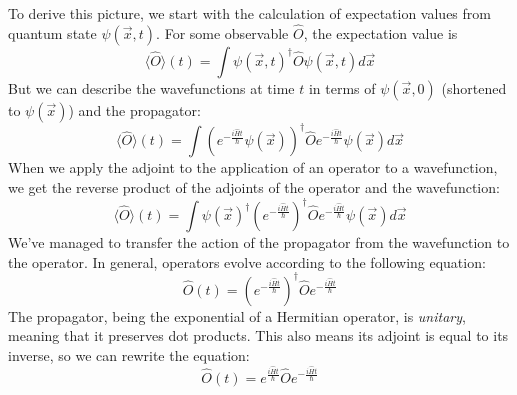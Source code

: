 To derive this picture, we start with the calculation of expectation values from quantum state
$\psi\left(\vec{x},t\right)$. For some observable $\hat{O}$, the expectation value is
\begin{equation}
\langle\hat{O}\rangle\left(t\right) = \int 
    \psi\left(\vec{x},t\right)^\dagger \hat{O} \psi\left(\vec{x},t\right) d\vec{x}
\end{equation}
But we can describe the wavefunctions at time $t$ in terms of $\psi\left(\vec{x},0\right)$ 
(shortened to $\psi\left(\vec{x}\right)$) and the propagator:
\begin{equation}
\langle\hat{O}\rangle\left(t\right) = \int
    \left(e^{-\frac{i\hat{H}t}{\hbar}}\psi\left(\vec{x}\right)\right)^\dagger 
    \hat{O} e^{-\frac{i\hat{H}t}{\hbar}} \psi\left(\vec{x}\right) d\vec{x}
\end{equation}
When we apply the adjoint to the application of an operator to a wavefunction, we get the reverse
product of the adjoints of the operator and the wavefunction:
\begin{equation}
\langle\hat{O}\rangle\left(t\right) = \int
    \psi\left(\vec{x}\right)^\dagger \left(e^{-\frac{i\hat{H}t}{\hbar}}\right)^\dagger
    \hat{O} e^{-\frac{i\hat{H}t}{\hbar}} \psi\left(\vec{x}\right) d\vec{x}
\end{equation}
We've managed to transfer the action of the propagator from the wavefunction to the operator. In
general, operators evolve according to the following equation:
\begin{equation}
\hat{O}\left(t\right) =
\left(e^{-\frac{i\hat{H}t}{\hbar}}\right)^\dagger \hat{O} e^{-\frac{i\hat{H}t}{\hbar}}
\end{equation}
The propagator, being the exponential of a Hermitian operator, is \textit{unitary}, meaning that it
preserves dot products. This also means its adjoint is equal to its inverse, so we can rewrite the
equation:
\begin{equation}
\hat{O}\left(t\right) = e^{\frac{i\hat{H}t}{\hbar}} \hat{O} e^{-\frac{i\hat{H}t}{\hbar}}
\end{equation}


